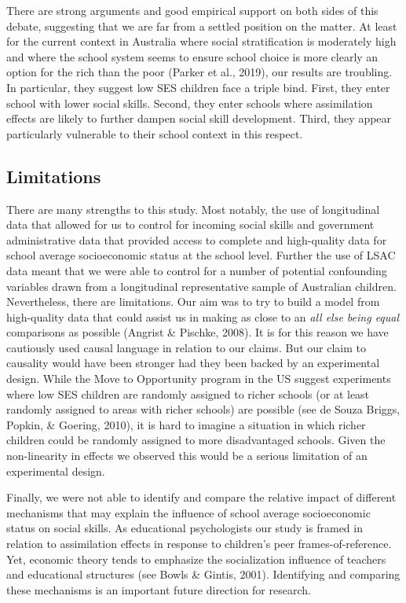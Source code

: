 \documentclass[
  english,
  man]{apa6}
\begin{document}
There are strong arguments and good empirical support on both sides of this debate, suggesting that we are far from a settled position on the matter. At least for the current context in Australia where social stratification is moderately high and where the school system seems to ensure school choice is more clearly an option for the rich than the poor (Parker et al., 2019), our results are troubling. In particular, they suggest low SES children face a triple bind. First, they enter school with lower social skills. Second, they enter schools where assimilation effects are likely to further dampen social skill development. Third, they appear particularly vulnerable to their school context in this respect.

\hypertarget{limitations}{%
\subsection{Limitations}\label{limitations}}

There are many strengths to this study. Most notably, the use of longitudinal data that allowed for us to control for incoming social skills and government administrative data that provided access to complete and high-quality data for school average socioeconomic status at the school level. Further the use of LSAC data meant that we were able to control for a number of potential confounding variables drawn from a longitudinal representative sample of Australian children. Nevertheless, there are limitations. Our aim was to try to build a model from high-quality data that could assist us in making as close to an \emph{all else being equal} comparisons as possible (Angrist \& Pischke, 2008). It is for this reason we have cautiously used causal language in relation to our claims. But our claim to causality would have been stronger had they been backed by an experimental design. While the Move to Opportunity program in the US suggest experiments where low SES children are randomly assigned to richer schools (or at least randomly assigned to areas with richer schools) are possible (see de Souza Briggs, Popkin, \& Goering, 2010), it is hard to imagine a situation in which richer children could be randomly assigned to more disadvantaged schools. Given the non-linearity in effects we observed this would be a serious limitation of an experimental design.

Finally, we were not able to identify and compare the relative impact of different mechanisms that may explain the influence of school average socioeconomic status on social skills. As educational psychologists our study is framed in relation to assimilation effects in response to children's peer frames-of-reference. Yet, economic theory tends to emphasize the socialization influence of teachers and educational structures (see Bowls \& Gintis, 2001). Identifying and comparing these mechanisms is an important future direction for research.
\end{document}

